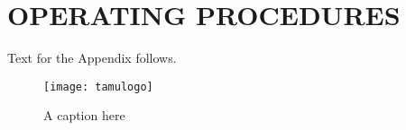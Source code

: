%
%	 
%


\chapter{OPERATING PROCEDURES}
\label{appendix:operation}

Text for the Appendix follows.

\begin{figure}[ht]
    \centering
    \texttt{[image: tamulogo]}
    \caption{A caption here}
\end{figure}


